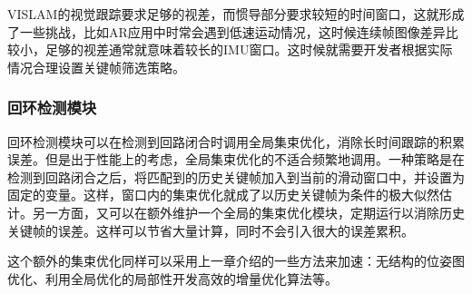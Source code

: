 VISLAM的视觉跟踪要求足够的视差，而惯导部分要求较短的时间窗口，这就形成了一些挑战，比如AR应用中时常会遇到低速运动情况，这时候连续帧图像差异比较小，足够的视差通常就意味着较长的IMU窗口。这时候就需要开发者根据实际情况合理设置关键帧筛选策略。

\subsubsection*{回环检测模块}

回环检测模块可以在检测到回路闭合时调用全局集束优化，消除长时间跟踪的积累误差。但是出于性能上的考虑，全局集束优化的不适合频繁地调用。一种策略是在检测到回路闭合之后，将匹配到的历史关键帧加入到当前的滑动窗口中，并设置为固定的变量。这样，窗口内的集束优化就成了以历史关键帧为条件的极大似然估计。另一方面，又可以在额外维护一个全局的集束优化模块，定期运行以消除历史关键帧的误差。这样可以节省大量计算，同时不会引入很大的误差累积。

这个额外的集束优化同样可以采用上一章介绍的一些方法来加速：无结构的位姿图优化、利用全局优化的局部性开发高效的增量优化算法等。
